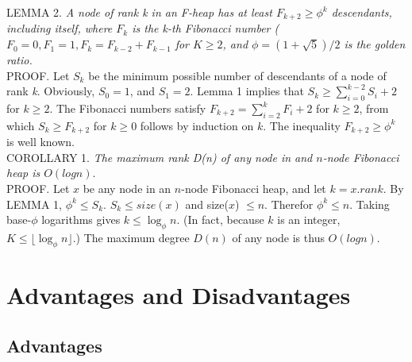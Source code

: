 \documentclass[12pt, a4paper]{article}
\begin{document}
	LEMMA 2. \textit{A node of rank k in an F-heap has at least $F_{k+2} \geq \phi^{k}$ descendants, including itself, where $F_k$ is the k-th Fibonacci number ($F_0 = 0, F_1 = 1, F_k = F_{k-2} + F_{k-1}$ for $ K \geq 2$, and $\phi = (1 + \sqrt{5}) / 2$ is the golden ratio.} \\
	PROOF. Let $S_k$ be the minimum possible number of descendants of a node of rank \textit{k}. Obviously, $S_0 = 1$, and $S_1 = 2$. Lemma 1 implies that $S_k \geq \sum_{i = 0}^{k-2}S_i + 2$ for $k \geq 2$. The Fibonacci numbers satisfy $F_{k+2} = \sum_{i = 2}^{k}F_i + 2$ for $k \geq 2$, from which $S_k \geq F_{k+2}$ for $k \geq 0$ follows by induction on $k$. The inequality $F_{k+2} \geq \phi^k$ is well known. \cite{fredman1987fibonacci} \\
	
	COROLLARY 1. \textit{The maximum rank D(n) of any node in and $n$-node Fibonacci heap is $O(log n)$}. \\
	PROOF. Let $x$ be any node in an $n$-node Fibonacci heap, and let $k = x.rank$. By LEMMA 1, $\phi^k \leq S_k$. $S_k \leq size(x)$ and size($x$) $\leq n$. Therefor $\phi^k \leq n$. Taking base-$\phi$ logarithms gives $ k \leq \log_{\phi}n$. (In fact, because $k$ is an integer, $K \leq \lfloor \log_{\phi}n \rfloor$.) The maximum degree $D(n)$ of any node is thus $O(log n)$.
	
	
	
	
\section{Advantages and Disadvantages}
\subsection{Advantages}
\end{document}
